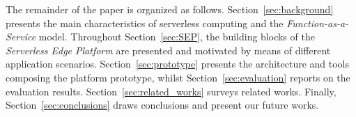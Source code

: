 The remainder of the paper is organized as follows. Section~\ref{sec:background} presents the main characteristics of serverless computing and the \textit{Function-as-a-Service} model.
Throughout Section~\ref{sec:SEP}, the building blocks of the \textit{Serverless Edge Platform} are presented and motivated by means of different application scenarios. Section~\ref{sec:prototype} presents the architecture and tools composing the platform prototype, whilst Section~\ref{sec:evaluation} reports on the evaluation results. Section~\ref{sec:related_works} surveys related works. Finally, Section~\ref{sec:conclusions} draws conclusions and present our future works.





